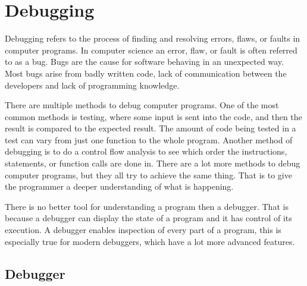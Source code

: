 \section{Debugging}
 

Debugging refers to the process of finding and resolving errors, flaws, or faults in computer programs.
In computer science an error, flaw, or fault is often referred to as a bug.
Bugs are the cause for software behaving in an unexpected way.
Most bugs arise from badly written code, lack of communication between the developers and lack of programming knowledge.


There are multiple methods to debug computer programs.
One of the most common methods is testing, where some input is sent into the code, and then the result is compared to the expected result.
The amount of code being tested in a test can vary from just one function to the whole program.
Another method of debugging is to do a control flow analysis to see which order the instructions, statements, or function calls are done in.
There are a lot more methods to debug computer programs, but they all try to achieve the same thing.
That is to give the programmer a deeper understanding of what is happening.


There is no better tool for understanding a program then a debugger.
That is because a debugger can display the state of a program and it has control of its execution.
A debugger enables inspection of every part of a program, this is especially true for modern debuggers, which have a lot more advanced features.


\subsection{Debugger}
 
